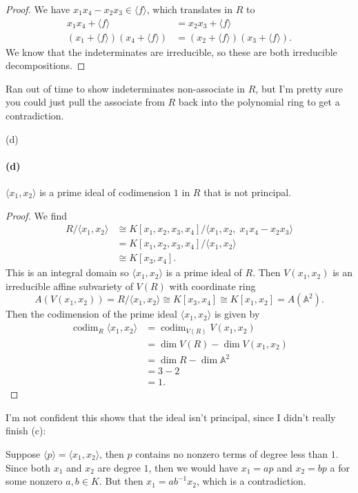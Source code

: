 \documentclass[12pt]{article}
\newenvironment{fullbox}{\begin{lrbox}{\savefullbox}\begin{minipage}{\dimexpr\textwidth-2\fboxsep\relax}}{\end{minipage}\end{lrbox}\begin{center}\framebox[\textwidth]{\usebox{\savefullbox}}\end{center}}
\newenvironment{pbox}[1][]{\begin{fullbox}\ifx#1\empty\else\paragraph{#1}\fi}{\end{fullbox}}
\theoremstyle{definition}
\newcommand{\<}{\langle}
\renewcommand{\>}{\rangle}
\newcommand{\A}{\mathbb{A}}
\newcommand{\isom}{\cong}
\begin{document}
\begin{proof}
    We have $x_1x_4 - x_2x_3 \in \<f\>$, which translates in $R$ to
    \begin{align*}
        x_1x_4 + \<f\> &= x_2x_3 + \<f\> \\
        (x_1 + \<f\>)(x_4 + \<f\>) &= (x_2 + \<f\>)(x_3 + \<f\>).
    \end{align*}
    We know that the indeterminates are irreducible, so these are both irreducible decompositions.

\end{proof}

Ran out of time to show indeterminates non-associate in $R$, but I'm pretty sure you could just pull the associate from $R$ back into the polynomial ring to get a contradiction.


\newpage
\begin{pbox}[(d)]
    $\<x_1, x_2\>$ is a prime ideal of codimension $1$ in $R$ that is not principal.
\end{pbox}

\begin{proof}
    We find
    \begin{align*}
        R/\<x_1, x_2\>
            &\isom K[x_1, x_2, x_3, x_4]/\<x_1, x_2,\; x_1x_4 - x_2x_3\> \\
            &= K[x_1, x_2, x_3, x_4]/\<x_1, x_2\> \\
            &\isom K[x_3, x_4].
    \end{align*}
    This is an integral domain so $\<x_1, x_2\>$ is a prime ideal of $R$. Then $V(x_1, x_2)$ is an irreducible affine subvariety of $V(R)$ with coordinate ring
    \[
        A(V(x_1, x_2))
            = R/\<x_1, x_2\>
            \isom K[x_3, x_4]
            \isom K[x_1, x_2]
            = A(\A^2).
    \]
    Then the codimension of the prime ideal $\<x_1, x_2\>$ is given by
    \begin{align*}
        \operatorname{codim}_R \<x_1, x_2\>
            &= \operatorname{codim}_{V(R)} V(x_1, x_2) \\
            &= \dim V(R) - \dim V(x_1, x_2) \\
            &= \dim R - \dim \A^2 \\
            &= 3 - 2 \\
            &= 1.
    \end{align*}

\end{proof}

I'm not confident this shows that the ideal isn't principal, since I didn't really finish (c):

Suppose $\<p\> = \<x_1, x_2\>$, then $p$ contains no nonzero terms of degree less than $1$. Since both $x_1$ and $x_2$ are degree $1$, then we would have $x_1 = ap$ and $x_2 = bp$ a for some nonzero $a, b \in K$. But then $x_1 = ab^{-1}x_2$, which is a contradiction.
    
\end{document}
